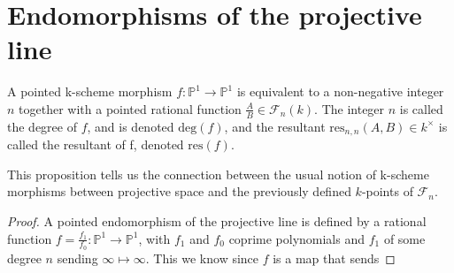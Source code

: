 \section{Endomorphisms of the projective line}
%
\begin{proposition}\label{Prop:Equivalent notions of morphisms}
%
A pointed k-scheme morphism  \(f: \mathbb{P}^1 \longrightarrow \mathbb{P}^1\) is equivalent to a non-negative integer \(n\) together with a pointed rational function \(\frac{A}{B}\in \mathcal{F}_n(k)\). The integer \(n\) is called the degree of \(f\), and is denoted \(\text{deg}(f)\), and the resultant \(\text{res}_{n,n}(A,B)\in k^{\times}\) is called the resultant of f, denoted \(\text{res}(f)\).
%
\begin{remark}\label{rm:connection between k-s morph and rat func}
%
This proposition tells us the connection between the usual notion of k-scheme morphisms between projective space and the previously defined \(k\)-points of \(\mathcal{F}_n\).
%
\end{remark}
%
%
\begin{proof}
%
A pointed endomorphism of the projective line is defined by a rational function \(f=\frac{f_1}{f_0}:\mathbb{P}^1\longrightarrow \mathbb{P}^1\), with \(f_1\) and \(f_0\) coprime polynomials and \(f_1\) of some degree \(n\) sending \(\infty \mapsto \infty\). This we know since \(f\) is a map that sends

\iffalse
Since \(f(\infty)=\infty\), we may consider the restriction \(f_{|\mathbb{A}^1} = f_0 : \mathbb{A}^1 \to \mathbb{A}^1 \). This is given by a polynomial \(f_0 = A\) of some degree, say m. 
\fi


\end{proof}
\end{proposition}
